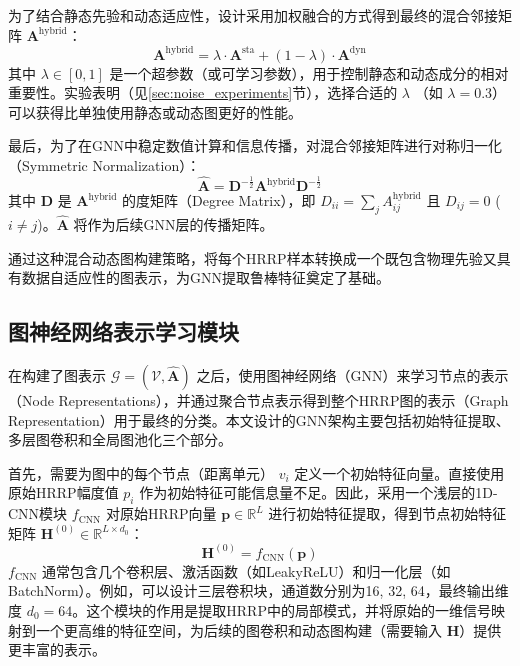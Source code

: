 为了结合静态先验和动态适应性，设计采用加权融合的方式得到最终的混合邻接矩阵 $\mathbf{A}^{\text{hybrid}}$：
\begin{equation}
    \mathbf{A}^{\text{hybrid}} = \lambda \cdot \mathbf{A}^{\text{sta}} + (1-\lambda) \cdot \mathbf{A}^{\text{dyn}}
    \label{eq:hybrid_adjacency}
\end{equation}
其中 $\lambda \in [0,1]$ 是一个超参数（或可学习参数），用于控制静态和动态成分的相对重要性。实验表明（见\ref{sec:noise_experiments}节），选择合适的 $\lambda$ （如 $\lambda=0.3$）可以获得比单独使用静态或动态图更好的性能。

最后，为了在GNN中稳定数值计算和信息传播，对混合邻接矩阵进行对称归一化（Symmetric Normalization）：
\begin{equation}
    \hat{\mathbf{A}} = \mathbf{D}^{-\frac{1}{2}} \mathbf{A}^{\text{hybrid}} \mathbf{D}^{-\frac{1}{2}}
    \label{eq:normalized_adjacency}
\end{equation}
其中 $\mathbf{D}$ 是 $\mathbf{A}^{\text{hybrid}}$ 的度矩阵（Degree Matrix），即 $D_{ii} = \sum_j A^{\text{hybrid}}_{ij}$ 且 $D_{ij}=0$ ($i \neq j$)。$\hat{\mathbf{A}}$ 将作为后续GNN层的传播矩阵。

通过这种混合动态图构建策略，将每个HRRP样本转换成一个既包含物理先验又具有数据自适应性的图表示，为GNN提取鲁棒特征奠定了基础。

\subsection{图神经网络表示学习模块}
\label{subsec:gnn_module}

在构建了图表示 $\mathcal{G} = (\mathcal{V}, \hat{\mathbf{A}})$ 之后，使用图神经网络（GNN）来学习节点的表示（Node Representations），并通过聚合节点表示得到整个HRRP图的表示（Graph Representation）用于最终的分类。本文设计的GNN架构主要包括初始特征提取、多层图卷积和全局图池化三个部分。

首先，需要为图中的每个节点（距离单元） $v_i$ 定义一个初始特征向量。直接使用原始HRRP幅度值 $p_i$ 作为初始特征可能信息量不足。因此，采用一个浅层的1D-CNN模块 $f_{\text{CNN}}$ 对原始HRRP向量 $\mathbf{p} \in \mathbb{R}^{L}$ 进行初始特征提取，得到节点初始特征矩阵 $\mathbf{H}^{(0)} \in \mathbb{R}^{L \times d_0}$：
\begin{equation}
    \mathbf{H}^{(0)} = f_{\text{CNN}}(\mathbf{p})
    \label{eq:initial_features}
\end{equation}
$f_{\text{CNN}}$ 通常包含几个卷积层、激活函数（如LeakyReLU）和归一化层（如BatchNorm）。例如，可以设计三层卷积块，通道数分别为16, 32, 64，最终输出维度 $d_0=64$。这个模块的作用是提取HRRP中的局部模式，并将原始的一维信号映射到一个更高维的特征空间，为后续的图卷积和动态图构建（需要输入 $\mathbf{H}$）提供更丰富的表示。

